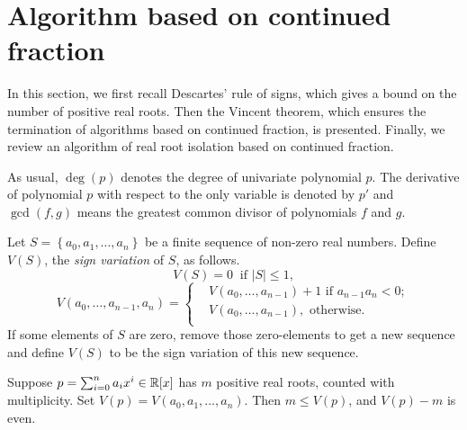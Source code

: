 
\section{Algorithm based on  continued fraction}
In this section, we first recall Descartes' rule of signs, which gives a bound on the number of positive real roots. Then the Vincent theorem, which  ensures
the termination of algorithms based on  continued fraction, is presented. Finally, we review an algorithm of real root isolation based on  continued fraction.

As usual, $\deg(p)$ denotes the degree of univariate polynomial $p$. The derivative of polynomial $p$ with respect to the only variable is denoted by $p'$ and $\gcd(f,g)$ means the greatest common divisor of polynomials $f$ and $g$.

\begin{note}
Let $S=\left\{ a_0,a_1,\ldots,a_n \right\}$ be a finite sequence of non-zero real numbers. Define $V(S)$, the {\em sign variation} of $S$, as follows.
\[V(S)=0\ \text{ if } |S|\le1,\]
\[  V(a_0,\ldots,a_{n-1},a_n)=  \left\{\begin{aligned}
 &  V(a_0,\ldots,a_{n-1})+1 \text{ if }a_{n-1}a_n<0;\\
&V(a_0,\ldots,a_{n-1}), \text{ otherwise}.\\
	\end{aligned}
	\right.
\]
If some elements of $S$ are zero, remove those zero-elements to get a new sequence and define $V(S)$ to be the sign variation of this new sequence.
\end{note}





\begin{theorem} \label{thm:des}
  Suppose $p=\sum_{i=0}^na_ix^i\in{\mathbb R}[x]$ has $m$ positive real roots, counted with multiplicity. Set $V(p)=V(a_0,a_1,\ldots,a_n)$. Then $m\le V(p)$, and $V(p)-m$ is even.
\end{theorem}



